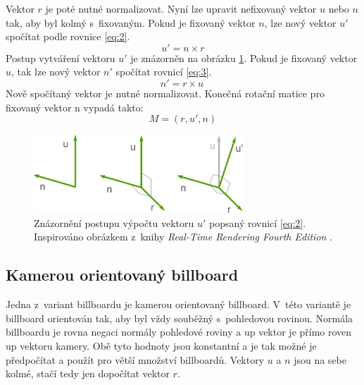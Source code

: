 Vektor \(r\) je poté nutné normalizovat. Nyní lze upravit nefixovaný vektor \(u\) nebo \(n\) tak, aby byl kolmý s~fixovaným. Pokud je fixovaný vektor \(n\), lze nový vektor \(u'\) spočítat podle rovnice \ref{eq:2}.
\begin{equation}
u' = n \times r
\label{eq:2}
\end{equation}
Postup vytváření vektoru \(u'\) je znázorněn na obrázku \ref{fig:rotation_expample}. Pokud je fixovaný vektor $u$, tak lze nový vektor $n'$ spočítat rovnicí \ref{eq:3}.
\begin{equation}
n' = r \times
u~\label{eq:3}
\end{equation}
Nově spočítaný vektor je nutné normalizovat. Konečná rotační matice pro fixovaný vektor n   vypadá takto:
\[M = (r, u', n)\]

\begin{figure}[H]
	\centering
	\includegraphics[width=0.7\textwidth]{obrazky-figures/billboarding_rot.pdf}
	\caption{Znázornění postupu výpočtu vektoru \(u'\) popsaný rovnicí \ref{eq:2}. Inspirováno obrázkem z~knihy \emph{Real-Time Rendering Fourth Edition} \cite[kapitola 13.6]{ller2018real}. }
	\label{fig:rotation_expample}
\end{figure}
\subsection{Kamerou orientovaný billboard}
\label{sec:camoriented_billboard}
Jedna z~variant billboardu je kamerou orientovaný billboard. V~této variantě je billboard orientován tak, aby byl vždy souběžný s~pohledovou rovinou. Normála billboardu je rovna negaci normály pohledové roviny a up vektor je přímo roven up vektoru kamery. Obě tyto hodnoty jsou konstantní a je tak možné je předpočítat a použít pro větší množství billboardů. Vektory \(u\) a \(n\) jsou na sebe kolmé, stačí tedy jen dopočítat vektor \(r\). 


